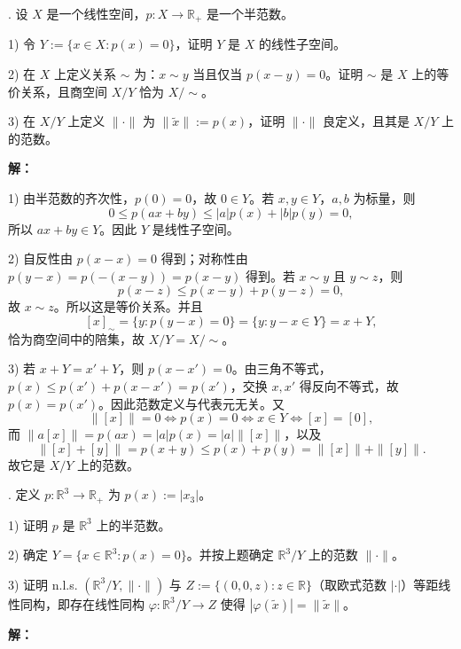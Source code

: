 \documentclass{article}
\begin{document}
\par\medskip

\par\medskip{}. 设 $X$ 是一个线性空间，$p:X\to\mathbb R_+$ 是一个半范数。

1) 令 $Y:=\{x\in X:p(x)=0\}$，证明 $Y$ 是 $X$ 的线性子空间。

2) 在 $X$ 上定义关系 $\sim$ 为：$x\sim y$ 当且仅当 $p(x-y)=0$。证明 $\sim$ 是 $X$ 上的等价关系，且商空间 $X/Y$ 恰为 $X/{\sim}$。

3) 在 $X/Y$ 上定义 $\|\cdot\|$ 为 $\|\widetilde x\|:=p(x)$，证明 $\|\cdot\|$ 良定义，且其是 $X/Y$ 上的范数。


\par{}\noindent\textbf{解：}\par\nopagebreak[4]

1) 由半范数的齐次性，$p(0)=0$，故 $0\in Y$。若 $x,y\in Y$，$a,b$ 为标量，则
\[
0\le p(ax+by)\le |a|p(x)+|b|p(y)=0,
\]
所以 $ax+by\in Y$。因此 $Y$ 是线性子空间。

2) 自反性由 $p(x-x)=0$ 得到；对称性由 $p(y-x)=p(-(x-y))=p(x-y)$ 得到。若 $x\sim y$ 且 $y\sim z$，则
\[
p(x-z)\le p(x-y)+p(y-z)=0,
\]
故 $x\sim z$。所以这是等价关系。并且
\[
[x]_{\sim}=\{y:p(y-x)=0\}=\{y:y-x\in Y\}=x+Y,
\]
恰为商空间中的陪集，故 $X/Y=X/{\sim}$。

3) 若 $x+Y=x'+Y$，则 $p(x-x')=0$。由三角不等式，$p(x)\le p(x')+p(x-x')=p(x')$，交换 $x,x'$ 得反向不等式，故 $p(x)=p(x')$。因此范数定义与代表元无关。又
\[
\|[x]\|=0\iff p(x)=0\iff x\in Y\iff[x]=[0],
\]
而 $\|a[x]\|=p(ax)=|a|p(x)=|a|\|[x]\|$，以及
\[
\|[x]+[y]\|=p(x+y)\le p(x)+p(y)=\|[x]\|+\|[y]\|.
\]
故它是 $X/Y$ 上的范数。

\par\medskip

\par\medskip{}. 定义 $p:\mathbb R^3\to\mathbb R_+$ 为 $p(x):=|x_3|$。

1) 证明 $p$ 是 $\mathbb R^3$ 上的半范数。

2) 确定 $Y=\{x\in\mathbb R^3:p(x)=0\}$。并按上题确定 $\mathbb R^3/Y$ 上的范数 $\|\cdot\|$。

3) 证明 n.l.s. $(\mathbb R^3/Y,\|\cdot\|)$ 与 $Z:=\{(0,0,z):z\in\mathbb R\}$（取欧式范数 $|\cdot|$）等距线性同构，即存在线性同构 $\varphi:\mathbb R^3/Y\to Z$ 使得 $|\varphi(\widetilde x)|=\|\widetilde x\|$。


\par{}\noindent\textbf{解：}\par\nopagebreak[4]
\end{document}
